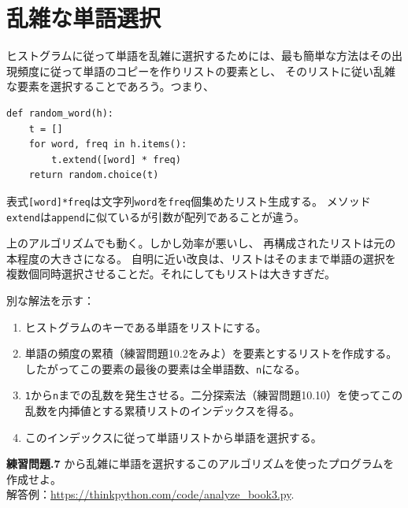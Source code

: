 \documentclass[a4j,12pt,makeidx]{jbook}
\newcommand{\tp}{\thechapter}
\begin{document}
\section{乱雑な単語選択}
ヒストグラムに従って単語を乱雑に選択するためには、最も簡単な方法はその出現頻度に従って単語のコピーを作りリストの要素とし、
そのリストに従い乱雑な要素を選択することであろう。つまり、
\begin{verbatim}
def random_word(h):
    t = []
    for word, freq in h.items():
        t.extend([word] * freq)
    return random.choice(t)
\end{verbatim}
表式{\tt [word]*freq}は文字列{\tt word}を{\tt freq}個集めたリスト生成する。
メソッド{\tt extend}は{\tt append}に似ているが引数が配列であることが違う。\par
上のアルゴリズムでも動く。しかし効率が悪いし、
再構成されたリストは元の本程度の大きさになる。
自明に近い改良は、リストはそのままで単語の選択を複数個同時選択させることだ。それにしてもリストは大きすぎだ。 \par
別な解法を示す：
\begin{enumerate}
\item ヒストグラムのキーである単語をリストにする。
\item 単語の頻度の累積（練習問題10.2をみよ）を要素とするリストを作成する。したがってこの要素の最後の要素は全単語数、{\tt n}になる。
\item {\tt 1}から{\tt n}までの乱数を発生させる。二分探索法（練習問題10.10）を使ってこの乱数を内挿値とする累積リストのインデックスを得る。
\item このインデックスに従って単語リストから単語を選択する。
\end{enumerate}

\noindent
{\bf 練習問題\tp.7} から乱雑に単語を選択するこのアルゴリズムを使ったプログラムを作成せよ。 \\
解答例：\url{https://thinkpython.com/code/analyze_book3.py}.
%
\end{document}
